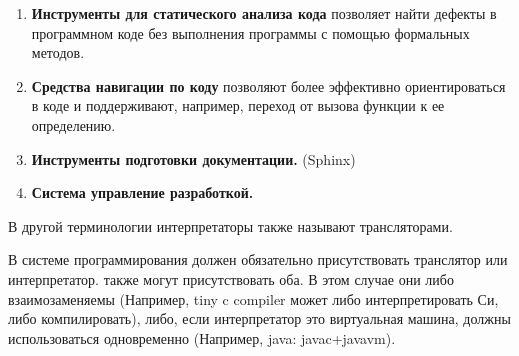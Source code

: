 \begin{itemize}
\begin{enumerate}
        \item \textbf{Инструменты для статического анализа кода} позволяет найти дефекты в программном коде без выполнения программы с помощью формальных методов.
        \item \textbf{Средства навигации по коду} позволяют более эффективно ориентироваться в коде и поддерживают, например, переход от вызова функции к ее определению.
        \item \textbf{Инструменты подготовки документации.} (Sphinx)
        \item \textbf{Система управление разработкой.}
    \end{enumerate}
\end{itemize}

В другой терминологии интерпретаторы также называют трансляторами.

В системе программирования должен обязательно присутствовать транслятор или интерпретатор.
также могут присутствовать оба. В этом случае они либо взаимозаменяемы (Например, tiny c compiler может либо интерпретировать Си, либо компилировать),
либо, если интерпретатор это виртуальная машина, должны использоваться одновременно (Например, java: javac+javavm).

